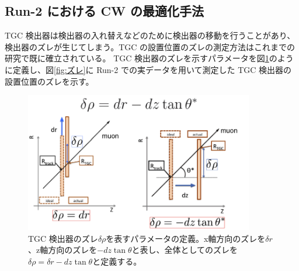\subsection{Run-2 における CW の最適化手法}
TGC 検出器は検出器の入れ替えなどのために検出器の移動を行うことがあり、検出器のズレが生じてしまう。TGC の設置位置のズレの測定方法はこれまでの研究で既に確立されている。
TGC 検出器のズレを示すパラメータを図\ref{fig:dr_para}のように定義し、図\ref{fig:ズレ}に Run-2 での実データを用いて測定した TGC 検出器の設置位置のズレを示す。
\begin{figure}[tb]
  \centering
  \includegraphics[clip, width=10cm]{fig/3/drho_param_position_measurement.png}
  \caption{TGC 検出器のズレ$\delta\rho$を表すパラメータの定義。x軸方向のズレを$\delta r$、z軸方向のズレを$-dz\tan\theta$と表し、全体としてのズレを$\delta\rho = \delta r -dz\tan\theta$と定義する。}
  \label{fig:dr_para}
\end{figure}

